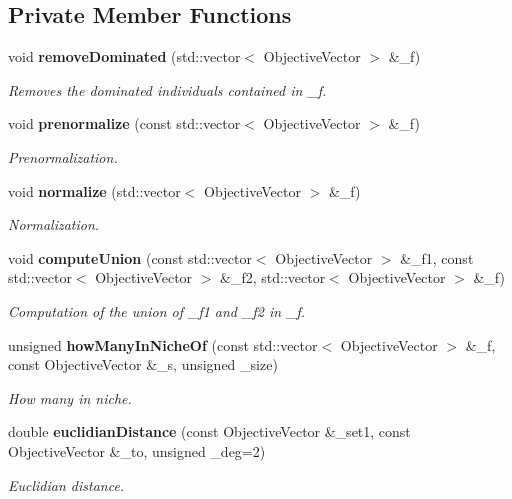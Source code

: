 \subsection*{Private Member Functions}
\begin{CompactItemize}
\item 
void {\bf remove\-Dominated} (std::vector$<$ Objective\-Vector $>$ \&\_\-f)
\begin{CompactList}\small\item\em Removes the dominated individuals contained in \_\-f. \item\end{CompactList}\item 
void {\bf prenormalize} (const std::vector$<$ Objective\-Vector $>$ \&\_\-f)
\begin{CompactList}\small\item\em Prenormalization. \item\end{CompactList}\item 
void {\bf normalize} (std::vector$<$ Objective\-Vector $>$ \&\_\-f)
\begin{CompactList}\small\item\em Normalization. \item\end{CompactList}\item 
void {\bf compute\-Union} (const std::vector$<$ Objective\-Vector $>$ \&\_\-f1, const std::vector$<$ Objective\-Vector $>$ \&\_\-f2, std::vector$<$ Objective\-Vector $>$ \&\_\-f)
\begin{CompactList}\small\item\em Computation of the union of \_\-f1 and \_\-f2 in \_\-f. \item\end{CompactList}\item 
unsigned {\bf how\-Many\-In\-Niche\-Of} (const std::vector$<$ Objective\-Vector $>$ \&\_\-f, const Objective\-Vector \&\_\-s, unsigned \_\-size)\label{classmoeoEntropyMetric_74cca13e6ea6d23c4cebb3af92a09ff9}

\begin{CompactList}\small\item\em How many in niche. \item\end{CompactList}\item 
double {\bf euclidian\-Distance} (const Objective\-Vector \&\_\-set1, const Objective\-Vector \&\_\-to, unsigned \_\-deg=2)\label{classmoeoEntropyMetric_670d6e5eb1a539aabc741138846bc747}

\begin{CompactList}\small\item\em Euclidian distance. \item\end{CompactList}\end{CompactItemize}
